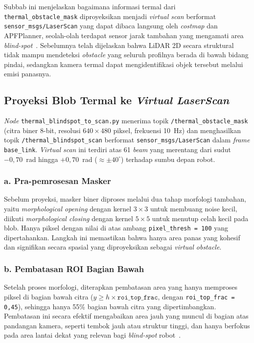 Subbab ini menjelaskan bagaimana informasi termal dari \texttt{thermal\_obstacle\_mask} diproyeksikan menjadi \textit{virtual scan} berformat \texttt{sensor\_msgs/LaserScan} yang dapat dibaca langsung oleh \textit{costmap} dan APFPlanner, seolah-olah terdapat sensor jarak tambahan yang mengamati area \textit{blind-spot}~\cite{Liu2024}. Sebelumnya telah dijelaskan bahwa LiDAR 2D secara struktural tidak mampu mendeteksi \textit{obstacle} yang seluruh profilnya berada di bawah bidang pindai, sedangkan kamera termal dapat mengidentifikasi objek tersebut melalui emisi panasnya.

\subsection{Proyeksi Blob Termal ke \textit{Virtual LaserScan}}
\label{sec:proyeksi_scan}

\textit{Node} \texttt{thermal\_blindspot\_to\_scan.py} menerima topik \texttt{/thermal\_obstacle\_mask} (citra biner 8-bit, resolusi $640 \times 480$ piksel, frekuensi 10~Hz) dan menghasilkan topik \texttt{/thermal\_blindspot\_scan} berformat \texttt{sensor\_msgs/LaserScan} dalam \textit{frame} \texttt{base\_link}. \textit{Virtual scan} ini terdiri atas 61 \textit{beam} yang merentang dari sudut $-0{,}70$~rad hingga $+0{,}70$~rad ($\approx \pm40^\circ$) terhadap sumbu depan robot.

\subsubsection*{a. Pra-pemrosesan Masker}

Sebelum proyeksi, masker biner diproses melalui dua tahap morfologi tambahan, yaitu \textit{morphological opening} dengan kernel $3 \times 3$ untuk membuang noise kecil, diikuti \textit{morphological closing} dengan kernel $5 \times 5$ untuk menutup celah kecil pada blob. Hanya piksel dengan nilai di atas ambang \texttt{pixel\_thresh = 100} yang dipertahankan. Langkah ini memastikan bahwa hanya area panas yang kohesif dan signifikan secara spasial yang diproyeksikan sebagai \textit{virtual obstacle}.

\subsubsection*{b. Pembatasan ROI Bagian Bawah}

Setelah proses morfologi, diterapkan pembatasan area yang hanya memproses piksel di bagian bawah citra ($y \geq h \times \texttt{roi\_top\_frac}$, dengan \texttt{roi\_top\_frac = 0,45}), sehingga hanya 55\% bagian bawah citra yang dipertimbangkan. Pembatasan ini secara efektif mengabaikan area jauh yang muncul di bagian atas pandangan kamera, seperti tembok jauh atau struktur tinggi, dan hanya berfokus pada area lantai dekat yang relevan bagi \textit{blind-spot} robot~\cite{Kibii2022}.

